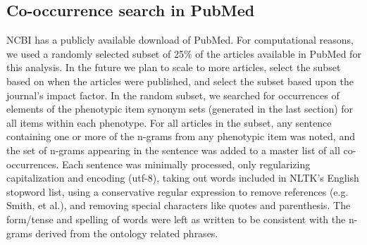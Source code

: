 \documentclass{sig-alternate}
\begin{document}

\subsection{Co-occurrence search in PubMed}

NCBI has a publicly available download of PubMed.
For computational reasons, we used a randomly selected subset of 25\% of the articles available in PubMed for this analysis. 
In the future we plan to scale to more articles, select the subset based on when the articles were published, and select the subset based upon the journal's impact factor.
In the random subset, we searched for occurrences of elements of the phenotypic item synonym sets (generated in the last section) for all items within each phenotype.
For all articles in the subset, any sentence containing one or more of the n-grams from any phenotypic item was noted, and the set of n-grams appearing in the sentence was added to a master list of all co-occurrences. 
Each sentence was minimally processed, only regularizing capitalization and encoding (utf-8), taking out words included in NLTK's English stopword list, using a conservative regular expression to remove references (e.g. Smith, et al.), and removing special characters like quotes and parenthesis. 
The form/tense and spelling of words were left as written to be consistent with the n-grams derived from the ontology related phrases.
\end{document}
